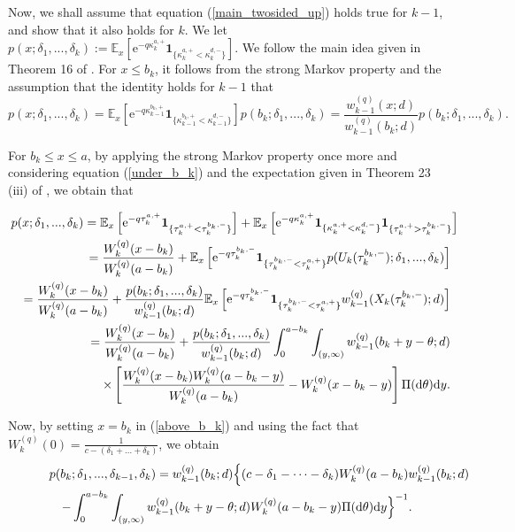 \documentclass[12pt,reqno]{amsart}
\theoremstyle{definition}
\theoremstyle{remark}
\newcommand{\e}{\mathbb{E}}
\newcommand{\ind}{\mathbf{1}}
\newcommand{\wq}{w^{(q)}}
\begin{document}
 Now, we shall assume that equation (\ref{main_twosided_up}) holds true for $k-1$, and show that it also holds for $k$.  
We let $p(x;\delta_1,...,\delta_k) :=\e_x \left[ \mathrm{e}^{-q \kappa_k^{a,+}} \ind_{\{\kappa_k^{a,+}< \kappa_k^{d,-}\}} \right]$. 
We follow the main idea given in Theorem 16 of \cite{kyprianouloeffen2010}. 
For $x \leq b_k$, it follows from the strong Markov property and the assumption that the identity holds for $k-1$ that
\begin{equation}\label{under_b_k}
p(x;\delta_1,...,\delta_k)=\e_x \left[ \mathrm{e}^{-q \kappa_{k-1}^{b_k,+}} \ind_{\{\kappa_{k-1}^{b_k,+}< \kappa_{k-1}^{d,-}\}} \right]
p(b_k;\delta_1,...,\delta_k) =\frac{\wq_{k-1}(x;d)}{\wq_{k-1}(b_k;d)} p(b_k;\delta_1,...,\delta_k). 
\end{equation}



For $b_k \leq x \leq  a$, by applying  the strong Markov property once more and considering equation (\ref{under_b_k}) and the expectation given in Theorem 23 (iii) of
\cite{kyprianouloeffen2010}, we obtain that 

\begin{eqnarray}\label{above_b_k}
\lefteqn{p(x;\delta_1,...,\delta_k)= \e_x \left[ \mathrm{e}^{-q \tau_k^{a,+}} \ind_{\{\tau_k^{a,+}< \tau_k^{b_k,-}\}} \right]+\e_x \left[ \mathrm{e}^{-q \kappa_k^{a,+}} \ind_{\{\kappa_k^{a,+}< \kappa_k^{d,-}\}} 
\ind_{\{\tau_k^{a,+}> \tau_k^{b_k,-}\}} \right]}\nonumber\\&&=
\frac{W_k^{(q)}(x-b_k)}{W_k^{(q)}(a-b_k)}+\e_x \left[ \mathrm{e}^{-q \tau_k^{b_k,-}} \ind_{\{\tau_k^{b_k,-}< \tau_k^{a,+}\} } 
p(U_k(\tau_k^{b_k,-});\delta_1,...,\delta_k) \right] \nonumber\\&&=
\frac{W_k^{(q)}(x-b_k)}{W_k^{(q)}(a-b_k)}+\frac{p(b_k;\delta_1,...,\delta_k)}{\wq_{k-1}(b_k;d)}\e_x \left[ \mathrm{e}^{-q \tau_k^{b_k,-}} \ind_{\{\tau_k^{b_k,-}< \tau_k^{a,+}\} } \wq_{k-1}(X_k(\tau_k^{b_k,-});d) \right]\nonumber\\\nonumber&&=
\frac{W_k^{(q)}(x-b_k)}{W_k^{(q)}(a-b_k)}+\frac{p(b_k;\delta_1,...,\delta_k)}{\wq_{k-1}(b_k;d)}
\int_{0}^{a-b_k}\int_{(y,\infty)} \wq_{k-1}(b_k+y-\theta;d) \\&& \quad \times 
\left[\frac{W_k^{(q)}(x-b_k)W_k^{(q)}(a-b_k-y)}{W_k^{(q)}(a-b_k)}-W_k^{(q)}(x-b_k-y)\right] \Pi(\textrm{d}\theta)\textrm{d}y. \end{eqnarray}

Now,  by setting $x=b_k$ in (\ref{above_b_k}) and using the fact that $W_k^{(q)}(0)=\frac{1}{c-(\delta_1+...+\delta_k)}$,  we obtain 
\begin{eqnarray}\label{p_for_b_k}
\lefteqn{p(b_k;\delta_1,...,\delta_{k-1},\delta_k)=\wq_{k-1}(b_k;d)\Big\{(c-\delta_1-\dots -\delta_k)W_k^{(q)}(a-b_k)\wq_{k-1}(b_k;d)}\nonumber\\&&-\int_{0}^{a-b_k}\int_{(y,\infty)}
  \wq_{k-1}(b_k+y-\theta;d) W_k^{(q)}(a-b_k-y)\Pi(\textrm{d}\theta)\textrm{d}y \Big\}^{-1}. 
\end{eqnarray}
\end{document}
